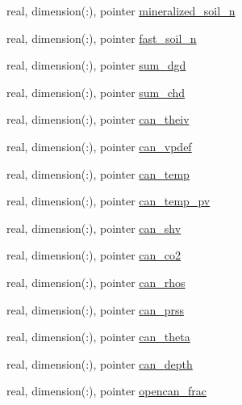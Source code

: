 \begin{DoxyCompactItemize}
\item 
real, dimension(\+:), pointer \hyperlink{structed__state__vars_1_1sitetype_aac981c2837797d4c05f16dedecc23e15}{mineralized\+\_\+soil\+\_\+n}
\item 
real, dimension(\+:), pointer \hyperlink{structed__state__vars_1_1sitetype_af541f9a9a7420ef132476b92737bf2d8}{fast\+\_\+soil\+\_\+n}
\item 
real, dimension(\+:), pointer \hyperlink{structed__state__vars_1_1sitetype_a3c83f6c2e2655ac33df743ed12e25609}{sum\+\_\+dgd}
\item 
real, dimension(\+:), pointer \hyperlink{structed__state__vars_1_1sitetype_a9959f28847dcb2cda62a1873973fef60}{sum\+\_\+chd}
\item 
real, dimension(\+:), pointer \hyperlink{structed__state__vars_1_1sitetype_aed9442a074e1647d085d3ef535381f7e}{can\+\_\+theiv}
\item 
real, dimension(\+:), pointer \hyperlink{structed__state__vars_1_1sitetype_af2a6611fae1863382e0655f2cbf7d9ba}{can\+\_\+vpdef}
\item 
real, dimension(\+:), pointer \hyperlink{structed__state__vars_1_1sitetype_a6c550197f38bf79d7443a6840bdcb5f0}{can\+\_\+temp}
\item 
real, dimension(\+:), pointer \hyperlink{structed__state__vars_1_1sitetype_a8647b435b1c4f59c6bc81a25172044b3}{can\+\_\+temp\+\_\+pv}
\item 
real, dimension(\+:), pointer \hyperlink{structed__state__vars_1_1sitetype_ad6203093c56962c316ae0a6da87b0b0e}{can\+\_\+shv}
\item 
real, dimension(\+:), pointer \hyperlink{structed__state__vars_1_1sitetype_a518702f1be4153e5887770c0bf8a32b8}{can\+\_\+co2}
\item 
real, dimension(\+:), pointer \hyperlink{structed__state__vars_1_1sitetype_abf2e58852c78435f8bbaf81bc7adf7a1}{can\+\_\+rhos}
\item 
real, dimension(\+:), pointer \hyperlink{structed__state__vars_1_1sitetype_a65dc9778e372b1f7b1844b6d996f31be}{can\+\_\+prss}
\item 
real, dimension(\+:), pointer \hyperlink{structed__state__vars_1_1sitetype_a67babe5bcd058b3b641926e8f94933ff}{can\+\_\+theta}
\item 
real, dimension(\+:), pointer \hyperlink{structed__state__vars_1_1sitetype_acad1f4a8f34d5778cf143e010535cc3e}{can\+\_\+depth}
\item 
real, dimension(\+:), pointer \hyperlink{structed__state__vars_1_1sitetype_a544ab8596524ec20f62cd6c79ee167a9}{opencan\+\_\+frac}

\end{DoxyCompactItemize}
